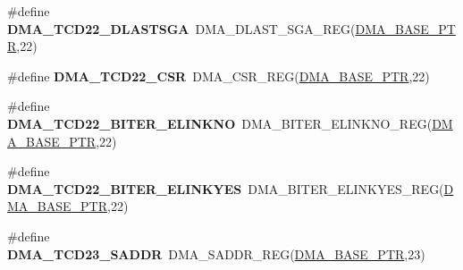 \begin{DoxyCompactItemize}
\item 
\hypertarget{group___d_m_a___register___accessor___macros_gadb0b7de852b6b15995e2ce664669a66e}{}\#define {\bfseries D\+M\+A\+\_\+\+T\+C\+D22\+\_\+\+D\+L\+A\+S\+T\+S\+G\+A}~D\+M\+A\+\_\+\+D\+L\+A\+S\+T\+\_\+\+S\+G\+A\+\_\+\+R\+E\+G(\hyperlink{group___d_m_a___peripheral_ga6997fbc1b1973e9f27170217a3bd6f22}{D\+M\+A\+\_\+\+B\+A\+S\+E\+\_\+\+P\+T\+R},22)\label{group___d_m_a___register___accessor___macros_gadb0b7de852b6b15995e2ce664669a66e}

\item 
\hypertarget{group___d_m_a___register___accessor___macros_ga9d87a130e223e72fc864084fc7bbaac7}{}\#define {\bfseries D\+M\+A\+\_\+\+T\+C\+D22\+\_\+\+C\+S\+R}~D\+M\+A\+\_\+\+C\+S\+R\+\_\+\+R\+E\+G(\hyperlink{group___d_m_a___peripheral_ga6997fbc1b1973e9f27170217a3bd6f22}{D\+M\+A\+\_\+\+B\+A\+S\+E\+\_\+\+P\+T\+R},22)\label{group___d_m_a___register___accessor___macros_ga9d87a130e223e72fc864084fc7bbaac7}

\item 
\hypertarget{group___d_m_a___register___accessor___macros_ga481c8b99545ce581f6a866b1d322a700}{}\#define {\bfseries D\+M\+A\+\_\+\+T\+C\+D22\+\_\+\+B\+I\+T\+E\+R\+\_\+\+E\+L\+I\+N\+K\+N\+O}~D\+M\+A\+\_\+\+B\+I\+T\+E\+R\+\_\+\+E\+L\+I\+N\+K\+N\+O\+\_\+\+R\+E\+G(\hyperlink{group___d_m_a___peripheral_ga6997fbc1b1973e9f27170217a3bd6f22}{D\+M\+A\+\_\+\+B\+A\+S\+E\+\_\+\+P\+T\+R},22)\label{group___d_m_a___register___accessor___macros_ga481c8b99545ce581f6a866b1d322a700}

\item 
\hypertarget{group___d_m_a___register___accessor___macros_ga390b05fbf3363e3156460765bbb43b22}{}\#define {\bfseries D\+M\+A\+\_\+\+T\+C\+D22\+\_\+\+B\+I\+T\+E\+R\+\_\+\+E\+L\+I\+N\+K\+Y\+E\+S}~D\+M\+A\+\_\+\+B\+I\+T\+E\+R\+\_\+\+E\+L\+I\+N\+K\+Y\+E\+S\+\_\+\+R\+E\+G(\hyperlink{group___d_m_a___peripheral_ga6997fbc1b1973e9f27170217a3bd6f22}{D\+M\+A\+\_\+\+B\+A\+S\+E\+\_\+\+P\+T\+R},22)\label{group___d_m_a___register___accessor___macros_ga390b05fbf3363e3156460765bbb43b22}

\item 
\hypertarget{group___d_m_a___register___accessor___macros_ga95ae479fae0f495352a79644c0a4fa47}{}\#define {\bfseries D\+M\+A\+\_\+\+T\+C\+D23\+\_\+\+S\+A\+D\+D\+R}~D\+M\+A\+\_\+\+S\+A\+D\+D\+R\+\_\+\+R\+E\+G(\hyperlink{group___d_m_a___peripheral_ga6997fbc1b1973e9f27170217a3bd6f22}{D\+M\+A\+\_\+\+B\+A\+S\+E\+\_\+\+P\+T\+R},23)\label{group___d_m_a___register___accessor___macros_ga95ae479fae0f495352a79644c0a4fa47}


\end{DoxyCompactItemize}
